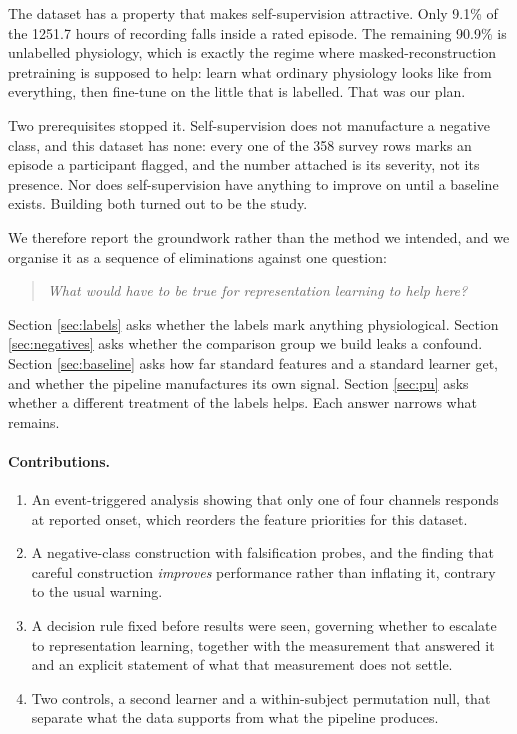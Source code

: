 \documentclass{article}
\begin{document}
The dataset has a property that makes self-supervision attractive. Only
9.1\% of the 1251.7 hours of recording falls inside a rated
episode. The remaining 90.9\% is unlabelled physiology, which is
exactly the regime where masked-reconstruction pretraining is supposed to help:
learn what ordinary physiology looks like from everything, then fine-tune on
the little that is labelled. That was our plan.

Two prerequisites stopped it. Self-supervision does not manufacture a negative
class, and this dataset has none: every one of the 358 survey rows marks an
episode a participant flagged, and the number attached is its severity, not its
presence. Nor does self-supervision have anything to improve on until a
baseline exists. Building both turned out to be the study.

We therefore report the groundwork rather than the method we intended, and we
organise it as a sequence of eliminations against one question:

\begin{quote}
\emph{What would have to be true for representation learning to help here?}
\end{quote}

Section \ref{sec:labels} asks whether the labels mark anything physiological.
Section \ref{sec:negatives} asks whether the comparison group we build leaks a
confound. Section \ref{sec:baseline} asks how far standard features and a
standard learner get, and whether the pipeline manufactures its own signal.
Section \ref{sec:pu} asks whether a different treatment of the labels helps.
Each answer narrows what remains.

\paragraph{Contributions.}
\begin{enumerate}
\item An event-triggered analysis showing that only one of four channels
      responds at reported onset, which reorders the feature priorities for
      this dataset.
\item A negative-class construction with falsification probes, and the finding
      that careful construction \emph{improves} performance rather than
      inflating it, contrary to the usual warning.
\item A decision rule fixed before results were seen, governing whether to
      escalate to representation learning, together with the measurement that
      answered it and an explicit statement of what that measurement does not
      settle.
\item Two controls, a second learner and a within-subject permutation null,
      that separate what the data supports from what the pipeline produces.
\end{enumerate}
\end{document}
